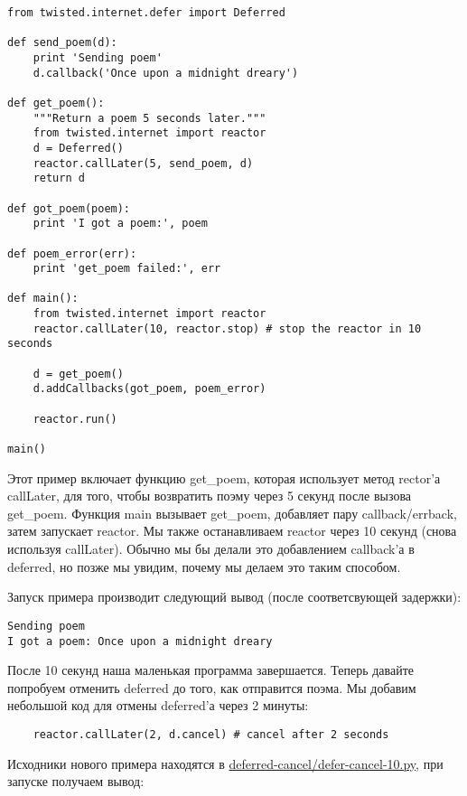  \begin{verbatim}
from twisted.internet.defer import Deferred

def send_poem(d):
    print 'Sending poem'
    d.callback('Once upon a midnight dreary')

def get_poem():
    """Return a poem 5 seconds later."""
    from twisted.internet import reactor
    d = Deferred()
    reactor.callLater(5, send_poem, d)
    return d

def got_poem(poem):
    print 'I got a poem:', poem

def poem_error(err):
    print 'get_poem failed:', err

def main():
    from twisted.internet import reactor
    reactor.callLater(10, reactor.stop) # stop the reactor in 10 seconds

    d = get_poem()
    d.addCallbacks(got_poem, poem_error)

    reactor.run()

main()
\end{verbatim} 


Этот пример включает функцию get\_poem, которая использует метод 
rector'а callLater, для того, чтобы возвратить поэму через 5 секунд 
после вызова get\_poem. Функция main вызывает get\_poem, добавляет 
пару callback/errback, затем запускает reactor. Мы также останавливаем 
reactor через 10 секунд (снова используя callLater). Обычно мы бы 
делали это добавлением callback'а в deferred, но позже мы увидим, 
почему мы делаем это таким способом.


Запуск примера производит следующий вывод (после соответсвующей задержки):

  \begin{verbatim}
Sending poem
I got a poem: Once upon a midnight dreary
\end{verbatim} 

После 10 секунд наша маленькая программа завершается. Теперь 
давайте попробуем отменить deferred до того, как отправится поэма. 
Мы добавим небольшой код для отмены deferred'а через 2 минуты:


 \begin{verbatim}
    reactor.callLater(2, d.cancel) # cancel after 2 seconds
\end{verbatim} 

Исходники нового примера находятся в 
\href{http://github.com/jdavisp3/twisted-intro/blob/master/deferred-cancel/defer-cancel-10.py#L1}{deferred-cancel/defer-cancel-10.py}, при запуске получаем вывод:

